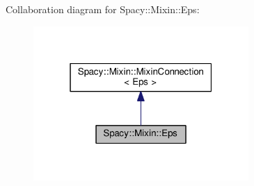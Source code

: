 Collaboration diagram for Spacy\+:\+:Mixin\+:\+:Eps\+:
\nopagebreak
\begin{figure}[H]
\begin{center}
\leavevmode
\includegraphics[width=232pt]{classSpacy_1_1Mixin_1_1Eps__coll__graph}
\end{center}
\end{figure}
